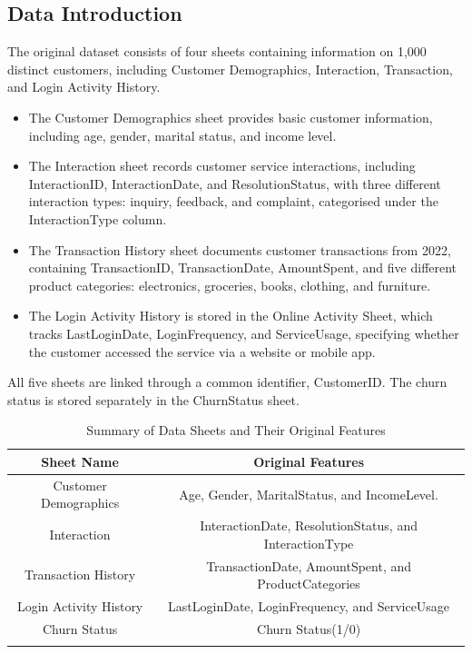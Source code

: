 \documentclass[journal=gmj]{CUP-JNL-DTM}%
\theoremstyle{definition}
\numberwithin{equation}{section}
\begin{document}
\subsection{Data Introduction}
The original dataset consists of four sheets containing information on 1,000 distinct customers, including Customer Demographics, Interaction, Transaction, and Login Activity History.
\begin{itemize}
\item The Customer Demographics sheet provides basic customer information, including age, gender, marital status, and income level. 
\item The Interaction sheet records customer service interactions, including InteractionID, InteractionDate, and ResolutionStatus, with three different interaction types: inquiry, feedback, and complaint, categorised under the InteractionType column.
\item The Transaction History sheet documents customer transactions from 2022, containing TransactionID, TransactionDate, AmountSpent, and five different product categories: electronics, groceries, books, clothing, and furniture.
\item The Login Activity History is stored in the Online Activity Sheet, which tracks LastLoginDate, LoginFrequency, and ServiceUsage, specifying whether the customer accessed the service via a website or mobile app.
\end{itemize}
All five sheets are linked through a common identifier, CustomerID. The churn status is stored separately in the ChurnStatus sheet.

\begin{table}[h]
    \centering
    \begin{tabular}{c|c}
        \hline
        \textbf{Sheet Name} & \textbf{Original Features} \\
        \hline
        Customer Demographics &  Age, Gender, MaritalStatus, and IncomeLevel. \\
        \hline
        Interaction &  InteractionDate, ResolutionStatus, and InteractionType \\
        \hline
        Transaction History &  TransactionDate, AmountSpent, and ProductCategories \\
        \hline
        Login Activity History &  LastLoginDate, LoginFrequency, and ServiceUsage \\
        \hline
        Churn Status & Churn Status(1/0)  \\
        \hline \\
    \end{tabular}
    \caption{Summary of Data Sheets and Their Original Features}
    \label{tab:data_summary}
\end{table}
\end{document}
